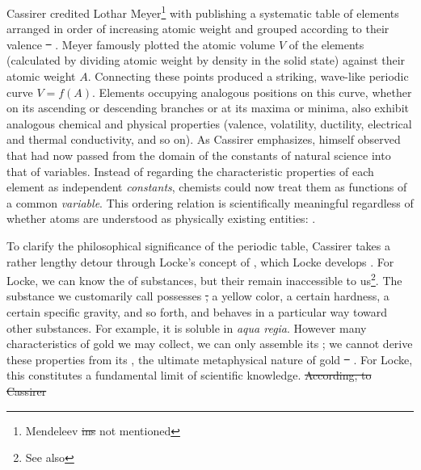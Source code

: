 \documentclass[submitted,12pt]{article}
\providecommand{\DIFadd}[1]{{\protect\color{blue}\uwave{#1}}} %
\providecommand{\DIFdel}[1]{{\protect\color{red}\sout{#1}}}                      %
\providecommand{\DIFaddbegin}{} %
\providecommand{\DIFaddend}{} %
\providecommand{\DIFdelbegin}{} %
\providecommand{\DIFdelend}{} %
\begin{document}
Cassirer credited Lothar Meyer\footnote{Mendeleev \DIFdelbegin \DIFdel{ins }\DIFdelend \DIFaddbegin \DIFadd{is }\DIFaddend not mentioned} with publishing a systematic table of elements arranged in order of increasing atomic weight and grouped according to their valence \DIFdelbegin \DIFdel{\mbox{%
\citep[see][e.g.]{Arnesano2025}}\hskip0pt%
}\DIFdelend \DIFaddbegin \DIFadd{\mbox{%
\citep[see, e.g.][]{Arnesano2025}}\hskip0pt%
}\DIFaddend . Meyer famously plotted the atomic volume $V$ of the elements (calculated by dividing atomic weight by density in the solid state) against their atomic weight $A$. Connecting these points produced a striking, wave-like periodic curve $V=f(A)$. Elements occupying analogous positions on this curve, whether on its ascending or descending branches or at its maxima or minima, also exhibit analogous chemical and physical properties (valence, volatility, ductility, electrical and thermal conductivity, and so on). As Cassirer emphasizes, \citet[176]{Meyer1884} himself observed that  had now passed from the domain of the constants of natural science into that of variables. Instead of regarding the characteristic properties of each element as independent \emph{constants}, chemists could now treat them as functions of a common \emph{variable}. This ordering relation is scientifically meaningful regardless of whether atoms are understood as physically existing entities:  .

To clarify the philosophical significance of the periodic table, Cassirer takes a rather lengthy detour through Locke's concept of , which Locke develops  . For Locke, we can know the  of substances, but their  remain inaccessible to us\footnote{See also \DIFdelbegin %
\DIFdelend \DIFaddbegin {}\DIFaddend }. The substance we customarily call  possesses \DIFdelbegin \DIFdel{, }\DIFdelend a yellow color, a certain hardness, a certain specific gravity, and so forth, and behaves in a particular way toward other substances. For example, it is soluble in \textit{aqua regia}. However many characteristics of gold we may collect, we can only assemble its ; we cannot derive these properties from its , the ultimate metaphysical nature of gold \DIFdelbegin \DIFdel{\mbox{%
\citep[see][6.III]{Cassirer1907}}\hskip0pt%
}\DIFdelend \DIFaddbegin \DIFadd{\mbox{%
\citep[see][6.III]{Cassirer1907b}}\hskip0pt%
}\DIFaddend . For Locke, this constitutes a fundamental limit of scientific knowledge. 
\DIFdelbegin \DIFdel{According, to Cassirer}\DIFdelend \DIFaddbegin 
\end{document}
